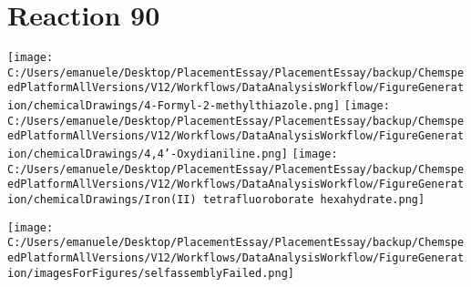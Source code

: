 \documentclass{article}%
\begin{document}
\section*{Reaction 90}%
%
\begin{scheme}[H]%
\begin{minipage}{0.5\textwidth}%
\texttt{[image: C:/Users/emanuele/Desktop/PlacementEssay/PlacementEssay/backup/ChemspeedPlatformAllVersions/V12/Workflows/DataAnalysisWorkflow/FigureGeneration/chemicalDrawings/4-Formyl-2-methylthiazole.png]}%
\texttt{[image: C:/Users/emanuele/Desktop/PlacementEssay/PlacementEssay/backup/ChemspeedPlatformAllVersions/V12/Workflows/DataAnalysisWorkflow/FigureGeneration/chemicalDrawings/4,4'-Oxydianiline.png]}%
\texttt{[image: C:/Users/emanuele/Desktop/PlacementEssay/PlacementEssay/backup/ChemspeedPlatformAllVersions/V12/Workflows/DataAnalysisWorkflow/FigureGeneration/chemicalDrawings/Iron(II) tetrafluoroborate hexahydrate.png]}%
\end{minipage}%
\begin{minipage}{0.5\textwidth}%
\begin{center}%
\texttt{[image: C:/Users/emanuele/Desktop/PlacementEssay/PlacementEssay/backup/ChemspeedPlatformAllVersions/V12/Workflows/DataAnalysisWorkflow/FigureGeneration/imagesForFigures/selfassemblyFailed.png]}%
\end{center}%
\end{minipage}%
\caption{Self-assembly of components 1, 15, with Iron(II) in a 3.0:1.5:1.0 molar ratio in CH$_3$CN at 60\textdegree C for 40h. These are the reagents (starting materials) for reaction 90.}%
\end{scheme}%
\end{document}
